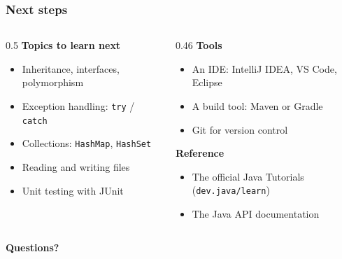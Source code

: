 \documentclass[aspectratio=169,10pt,compress]{beamer}
\begin{document}
\begin{frame}[t,fragile] \frametitle{Next steps}
  \begin{columns}[T]
    \begin{column}{0.5\textwidth}
      \textbf{Topics to learn next}
      \begin{itemize}\small
        \item Inheritance, interfaces, polymorphism
        \item Exception handling: \texttt{try} / \texttt{catch}
        \item Collections: \texttt{HashMap}, \texttt{HashSet}
        \item Reading and writing files
        \item Unit testing with JUnit
      \end{itemize}
    \end{column}
    \begin{column}{0.46\textwidth}
      \textbf{Tools}
      \begin{itemize}\small
        \item An IDE: IntelliJ IDEA, VS Code, Eclipse
        \item A build tool: Maven or Gradle
        \item Git for version control
      \end{itemize}
      \vspace{0.5em}
      \textbf{Reference}
      \begin{itemize}\small
        \item The official Java Tutorials (\texttt{dev.java/learn})
        \item The Java API documentation
      \end{itemize}
    \end{column}
  \end{columns}

  \vspace{1em}
  \begin{center}
    {\Large \textbf{Questions?}}
  \end{center}
\end{frame}
\end{document}
